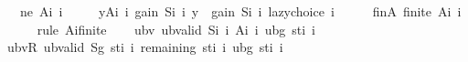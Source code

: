 \begin{isabellebody}
\ \ \ ne{\isacharcolon}{\kern0pt}\ {\isachardoublequoteopen}A{\isacharunderscore}{\kern0pt}i\ i\ {\isasymnoteq}\ {\isacharbraceleft}{\kern0pt}{\isacharbraceright}{\kern0pt}{\isachardoublequoteclose}\isanewline
\ \ \ {\isachardoublequoteopen}{\isasymforall}y{\isasymin}A{\isacharunderscore}{\kern0pt}i\ i{\isachardot}{\kern0pt}\ gain\ {\isacharparenleft}{\kern0pt}S{\isacharunderscore}{\kern0pt}i\ i{\isacharparenright}{\kern0pt}\ y\ {\isasymle}\ gain\ {\isacharparenleft}{\kern0pt}S{\isacharunderscore}{\kern0pt}i\ i{\isacharparenright}{\kern0pt}\ {\isacharparenleft}{\kern0pt}lazy{\isacharunderscore}{\kern0pt}choice\ i{\isacharparenright}{\kern0pt}{\isachardoublequoteclose}\isanewline
%
\isadelimproof
%
\endisadelimproof
%
\isatagproof
{}\isamarkupfalse%
\ {\isacharminus}{\kern0pt}\isanewline
\ \ \isamarkupfalse%
\ finA{\isacharcolon}{\kern0pt}\ {\isachardoublequoteopen}finite\ {\isacharparenleft}{\kern0pt}A{\isacharunderscore}{\kern0pt}i\ i{\isacharparenright}{\kern0pt}{\isachardoublequoteclose}\isanewline
\ \ \ \ \isamarkupfalse%
\ {\isacharparenleft}{\kern0pt}rule\ A{\isacharunderscore}{\kern0pt}i{\isacharunderscore}{\kern0pt}finite{\isacharparenright}{\kern0pt}\isanewline
\isanewline
\ \ \isamarkupfalse%
\ ubv{\isacharcolon}{\kern0pt}\ {\isachardoublequoteopen}ub{\isacharunderscore}{\kern0pt}valid\ {\isacharparenleft}{\kern0pt}S{\isacharunderscore}{\kern0pt}i\ i{\isacharparenright}{\kern0pt}\ {\isacharparenleft}{\kern0pt}A{\isacharunderscore}{\kern0pt}i\ i{\isacharparenright}{\kern0pt}\ {\isacharparenleft}{\kern0pt}ubg\ {\isacharparenleft}{\kern0pt}st{\isacharunderscore}{\kern0pt}i\ i{\isacharparenright}{\kern0pt}{\isacharparenright}{\kern0pt}{\isachardoublequoteclose}\isanewline
\ \ \isamarkupfalse%
\ {\isacharminus}{\kern0pt}\isanewline
\ \ \ \ \isamarkupfalse%
\ ubvR{\isacharcolon}{\kern0pt}\ {\isachardoublequoteopen}ub{\isacharunderscore}{\kern0pt}valid\ {\isacharparenleft}{\kern0pt}Sg\ {\isacharparenleft}{\kern0pt}st{\isacharunderscore}{\kern0pt}i\ i{\isacharparenright}{\kern0pt}{\isacharparenright}{\kern0pt}\ {\isacharparenleft}{\kern0pt}remaining\ {\isacharparenleft}{\kern0pt}st{\isacharunderscore}{\kern0pt}i\ i{\isacharparenright}{\kern0pt}{\isacharparenright}{\kern0pt}\ {\isacharparenleft}{\kern0pt}ubg\ {\isacharparenleft}{\kern0pt}st{\isacharunderscore}{\kern0pt}i\ i{\isacharparenright}{\kern0pt}{\isacharparenright}{\kern0pt}{\isachardoublequoteclose}\isanewline
\ \ \ \ \ \ \isamarkupfalse%

\end{isabellebody}
